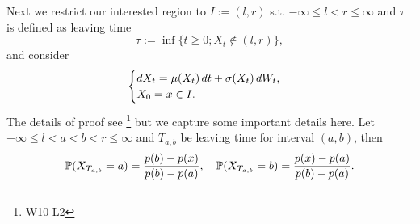 Next we restrict our interested region to $I := (l ,r)$ s.t. $-\infty \leq l < r \leq \infty$ and $\tau$ is defined as leaving time
\begin{equation*}
    \tau := \inf\{t\geq 0; X_t \notin (l ,r)\},
\end{equation*} and consider
\begin{equation*}
    \begin{cases}
        \mathop{}\!d X_t = \mu(X_t) \mathop{}\!d t + \sigma(X_t) \mathop{}\!d W_t,  \\
        X_0 = x \in I.
    \end{cases}
\end{equation*}
The details of proof see \footnote{W10 L2} but we capture some important details here. Let $-\infty \leq l < a < b < r \leq \infty$ and $T_{a,b}$ be leaving time for interval $(a,b)$, then
\begin{equation*}
    \mathbb{P}(X_{T_{a,b}}=a) = \frac{p(b) - p(x)}{p(b) - p(a)}, \quad \mathbb{P}(X_{T_{a,b}}=b) = \frac{p(x) - p(a)}{p(b) - p(a)}.
\end{equation*}

